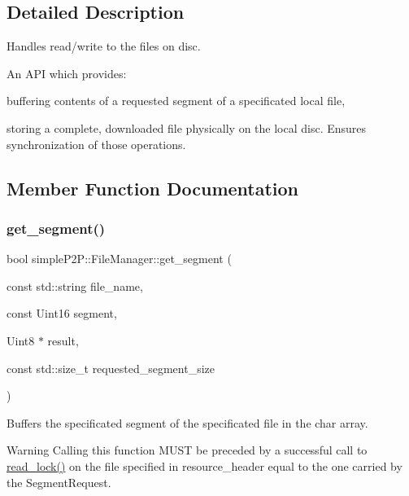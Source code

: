 \subsection{Detailed Description}
Handles read/write to the files on disc. 

An A\+PI which provides\+:
\begin{DoxyItemize}
\item buffering contents of a requested segment of a specificated local file,
\item storing a complete, downloaded file physically on the local disc. Ensures synchronization of those operations. 
\end{DoxyItemize}

\subsection{Member Function Documentation}
\mbox{\label{classsimpleP2P_1_1FileManager_ae6d78d28f40cc7fabe16de7a124a38be}} 
\subsubsection{\texorpdfstring{get\+\_\+segment()}{get\_segment()}}
{\footnotesize\ttfamily bool simple\+P2\+P\+::\+File\+Manager\+::get\+\_\+segment (\begin{DoxyParamCaption}\item[{const std\+::string}]{file\+\_\+name,  }\item[{const Uint16}]{segment,  }\item[{Uint8 $\ast$}]{result,  }\item[{const std\+::size\+\_\+t}]{requested\+\_\+segment\+\_\+size }\end{DoxyParamCaption})}



Buffers the specificated segment of the specificated file in the char array. 

\begin{DoxyWarning}{Warning}
Calling this function M\+U\+ST be preceded by a successful call to \hyperlink{classsimpleP2P_1_1FileManager_ad20db5b0d3c3eea9f22ddef7b28c3348}{read\+\_\+lock()} on the file specified in resource\+\_\+header equal to the one carried by the Segment\+Request.
\end{DoxyWarning}


